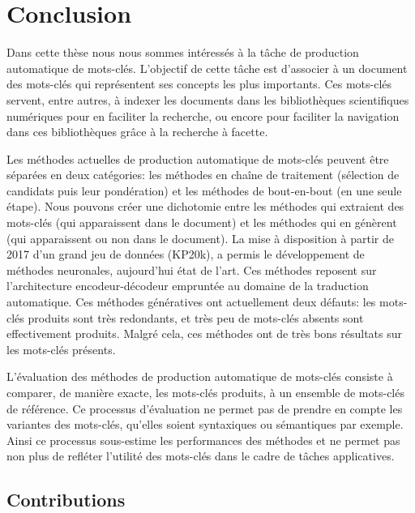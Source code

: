 \chapter{Conclusion}
\label{chap:conclusion}
Dans cette thèse nous nous sommes intéressés à la tâche de production automatique de mots-clés.
L'objectif de cette tâche est d'associer à un document des mots-clés qui représentent ses concepts les plus importants.
Ces mots-clés servent, entre autres, à indexer les documents dans les bibliothèques scientifiques numériques pour en faciliter la recherche, ou encore pour faciliter la navigation dans ces bibliothèques grâce à la recherche à facette.

Les méthodes actuelles de production automatique de mots-clés peuvent être séparées en deux catégories: les méthodes en chaîne de traitement (sélection de candidats puis leur pondération) et les méthodes de bout-en-bout (en une seule étape).
Nous pouvons créer une dichotomie entre les méthodes qui extraient des mots-clés (qui apparaissent dans le document) et les méthodes qui en génèrent (qui apparaissent ou non dans le document).
La mise à disposition à partir de 2017 d'un grand jeu de données (KP20k), a permis le développement de méthodes neuronales, aujourd'hui état de l'art.
Ces méthodes reposent sur l'architecture encodeur-décodeur empruntée au domaine de la traduction automatique.
Ces méthodes génératives ont actuellement deux défauts: les mots-clés produits sont très redondants, et très peu de mots-clés absents sont effectivement produits.
Malgré cela, ces méthodes ont de très bons résultats sur les mots-clés présents.

L'évaluation des méthodes de production automatique de mots-clés consiste à comparer, de manière exacte, les mots-clés produits, à un ensemble de mots-clés de référence.
Ce processus d'évaluation ne permet pas de prendre en compte les variantes des mots-clés, qu'elles soient syntaxiques ou sémantiques par exemple.
Ainsi ce processus sous-estime les performances des méthodes et ne permet pas non plus de refléter l'utilité des mots-clés dans le cadre de tâches applicatives.


\section{Contributions}


